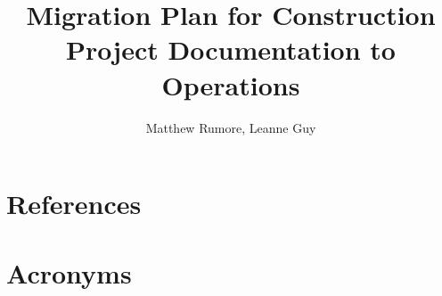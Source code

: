 \documentclass[OPS,authoryear,toc]{lsstdoc}
\title{Migration Plan for Construction Project Documentation to Operations}
\author{%
Matthew Rumore, Leanne Guy
}
\date{\vcsDate}
\begin{document}
\maketitle



\appendix

% 

\section{References} \label{sec:bib}
\renewcommand{\refname}{} %


\section{Acronyms} \label{sec:acronyms}

\end{document}
